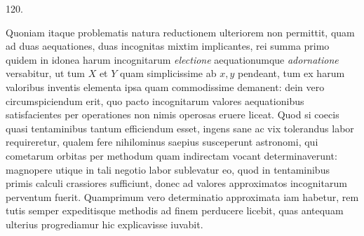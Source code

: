 \par{}\medskip
\begin{center}\hypertarget{native-166-article120}{}120.\end{center}
Quoniam itaque problematis natura reductionem ulteriorem non permittit,
quam ad duas aequationes, duas incognitas mixtim implicantes, rei summa
primo quidem in idonea harum incognitarum \emph{electione} aequationumque
\emph{adornatione} versabitur, ut tum $X$ et $Y$ quam simplicissime ab $x,y$ pendeant, tum ex
harum valoribus inventis elementa ipsa quam commodissime demanent: dein
vero circumspiciendum erit, quo pacto incognitarum valores aequationibus satisfacientes per operationes non nimis operosas eruere liceat. Quod si coecis
quasi tentaminibus tantum efficiendum esset, ingens sane ac vix tolerandus
labor requireretur, qualem fere nihilominus saepius susceperunt astronomi,
qui cometarum orbitas per methodum quam indirectam vocant determinaverunt:
magnopere utique in tali negotio labor sublevatur eo, quod in tentaminibus
primis calculi crassiores sufficiunt, donec ad valores approximatos incognitarum
perventum fuerit. Quamprimum vero determinatio approximata iam habetur,
rem tutis semper expeditisque methodis ad finem perducere licebit, quas antequam ulterius progrediamur hic explicavisse iuvabit.

